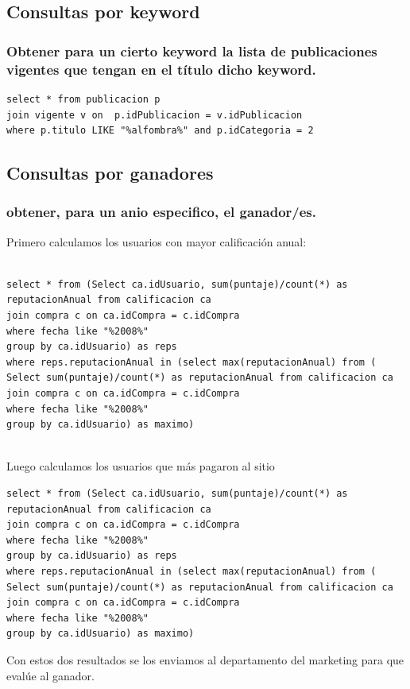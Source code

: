\documentclass[a4paper, 10pt, twoside]{article}
\begin{document}
\subsection{Consultas por keyword}
\subsubsection{Obtener para un cierto keyword la lista de publicaciones vigentes que tengan en el t\'itulo dicho keyword.}
\begin{verbatim}
select * from publicacion p 
join vigente v on  p.idPublicacion = v.idPublicacion
where p.titulo LIKE "%alfombra%" and p.idCategoria = 2
\end{verbatim}
\newpage
\subsection{Consultas por ganadores}
\subsubsection{ obtener, para un anio especifico, el ganador/es.}
Primero calculamos los usuarios con mayor calificaci\'on anual:
\begin{verbatim}

select * from (Select ca.idUsuario, sum(puntaje)/count(*) as reputacionAnual from calificacion ca
join compra c on ca.idCompra = c.idCompra
where fecha like "%2008%"
group by ca.idUsuario) as reps
where reps.reputacionAnual in (select max(reputacionAnual) from (
Select sum(puntaje)/count(*) as reputacionAnual from calificacion ca
join compra c on ca.idCompra = c.idCompra
where fecha like "%2008%"
group by ca.idUsuario) as maximo)


\end{verbatim}

Luego calculamos los usuarios que m\'as pagaron al sitio
\begin{verbatim}
select * from (Select ca.idUsuario, sum(puntaje)/count(*) as reputacionAnual from calificacion ca
join compra c on ca.idCompra = c.idCompra
where fecha like "%2008%"
group by ca.idUsuario) as reps
where reps.reputacionAnual in (select max(reputacionAnual) from (
Select sum(puntaje)/count(*) as reputacionAnual from calificacion ca
join compra c on ca.idCompra = c.idCompra
where fecha like "%2008%"
group by ca.idUsuario) as maximo)
\end{verbatim}

Con estos dos resultados se los enviamos al departamento del marketing para que eval\'ue al ganador.
\end{document}
